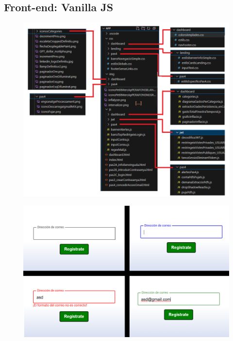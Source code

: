 \documentclass{beamer}
\begin{document}
	
		\subsection{Front-end: Vanilla JS}
		
		\begin{frame}
			\begin{figure}
				\centering
				\includegraphics[width=.7\linewidth]{../img/estructuraAplicacioFront}
				\caption{}
				\label{fig:estructuraaplicaciofront}
			\end{figure}
			
		\end{frame}
		
		
		\begin{frame}
			\begin{figure}
				\centering
				\includegraphics[width=1\linewidth]{../img/logicaInputBlurSignup}
		
				\label{fig:logicainputblursignup}
			\end{figure}
			
		\end{frame}
		
\end{document}
